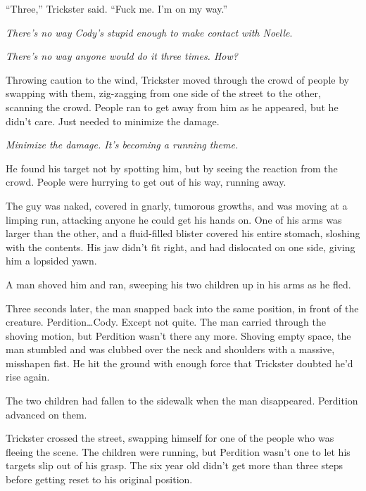 ``Three,'' Trickster said.  ``Fuck me.  I'm on my way.''



\sectionbreak



\emph{There's no way Cody's stupid enough to make contact with Noelle}.



\emph{There's no way anyone would do it three times.  How?}



Throwing caution to the wind, Trickster moved through the crowd of people by swapping with them, zig-zagging from one side of the street to the other, scanning the crowd.  People ran to get away from him as he appeared, but he didn't care.  Just needed to minimize the damage.



\emph{Minimize the damage.  It's becoming a running theme.}



He found his target not by spotting him, but by seeing the reaction from the crowd.  People were hurrying to get out of his way, running away.



The guy was naked, covered in gnarly, tumorous growths, and was moving at a limping run, attacking anyone he could get his hands on.  One of his arms was larger than the other, and a fluid-filled blister covered his entire stomach, sloshing with the contents.  His jaw didn't fit right, and had dislocated on one side, giving him a lopsided yawn.



A man shoved him and ran, sweeping his two children up in his arms as he fled.



Three seconds later, the man snapped back into the same position, in front of the creature.  Perdition\ldots Cody.  Except not quite.  The man carried through the shoving motion, but Perdition wasn't there any more.  Shoving empty space, the man stumbled and was clubbed over the neck and shoulders with a massive, misshapen fist.  He hit the ground with enough force that Trickster doubted he'd rise again.



The two children had fallen to the sidewalk when the man disappeared.  Perdition advanced on them.



Trickster crossed the street, swapping himself for one of the people who was fleeing the scene.  The children were running, but Perdition wasn't one to let his targets slip out of his grasp.  The six year old didn't get more than three steps before getting reset to his original position.



